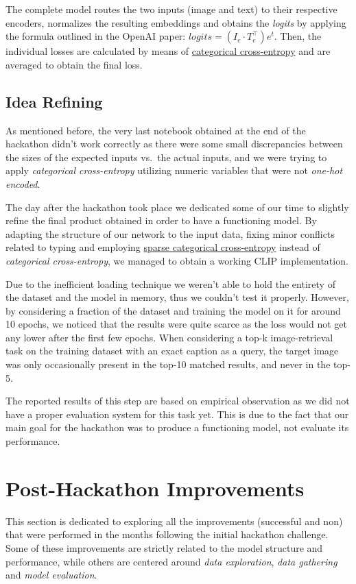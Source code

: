 \documentclass[12pt, a4paper]{article}
\begin{document}
The complete model routes the two inputs (image and text) to their respective encoders, normalizes the resulting embeddings and obtains the \textit{logits} by applying the formula outlined in the OpenAI paper: $logits = (I_e \cdot T_e^{\top})e^t$.
Then, the individual losses are calculated by means of \href{https://www.tensorflow.org/api_docs/python/tf/keras/losses/CategoricalCrossentropy}{categorical cross-entropy} and are averaged to obtain the final loss.

\subsection{Idea Refining}
As mentioned before, the very last notebook obtained at the end of the hackathon didn't work correctly as there were some small discrepancies between the sizes of the expected inputs vs.\ the actual inputs, and we were trying to apply \textit{categorical cross-entropy} utilizing numeric variables that were not \textit{one-hot encoded}.

The day after the hackathon took place we dedicated some of our time to slightly refine the final product obtained in order to have a functioning model.
By adapting the structure of our network to the input data, fixing minor conflicts related to typing and employing \href{https://www.tensorflow.org/api_docs/python/tf/keras/losses/SparseCategoricalCrossentropy}{sparse categorical cross-entropy} instead of \textit{categorical cross-entropy}, we managed to obtain a working CLIP implementation.

Due to the inefficient loading technique we weren't able to hold the entirety of the dataset and the model in memory, thus we couldn't test it properly.
However, by considering a fraction of the dataset and training the model on it for around 10 epochs, we noticed that the results were quite scarce as the loss would not get any lower after the first few epochs.
When considering a top-k image-retrieval task on the training dataset with an exact caption as a query, the target image was only occasionally present in the top-10 matched results, and never in the top-5.

The reported results of this step are based on empirical observation as we did not have a proper evaluation system for this task yet.
This is due to the fact that our main goal for the hackathon was to produce a functioning model, not evaluate its performance.

\section{Post-Hackathon Improvements}
This section is dedicated to exploring all the improvements (successful and non) that were performed in the months following the initial hackathon challenge.
Some of these improvements are strictly related to the model structure and performance, while others are centered around \textit{data exploration}, \textit{data gathering} and \textit{model evaluation}.
\end{document}
